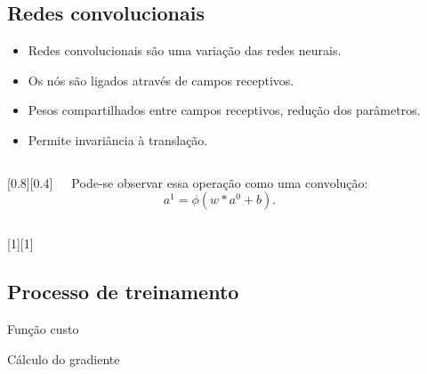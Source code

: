 \subsection{Redes convolucionais}
\begin{frame}{\insertsubsection}
	\begin{itemize}
	\item Redes convolucionais são uma variação das redes neurais.
	\item Os nós são ligados através de campos receptivos.
	\item Pesos compartilhados entre campos receptivos, redução dos parâmetros.
	\item Permite invariância à translação.
	\end{itemize}

	\begin{columns}
		[0.8][0.4]

		Pode-se observar essa operação como uma convolução:
		\begin{equation}
		a^1 = \phi(w \ast a^0 + b).
		\end{equation}

	\end{columns}
	
\end{frame}

\begin{frame}{\insertsubsection}
	[1]
\end{frame}

\subsection{Processo de treinamento}

\begin{frame}{Função custo}

\end{frame}

\begin{frame}{Cálculo do gradiente}
\end{frame}
